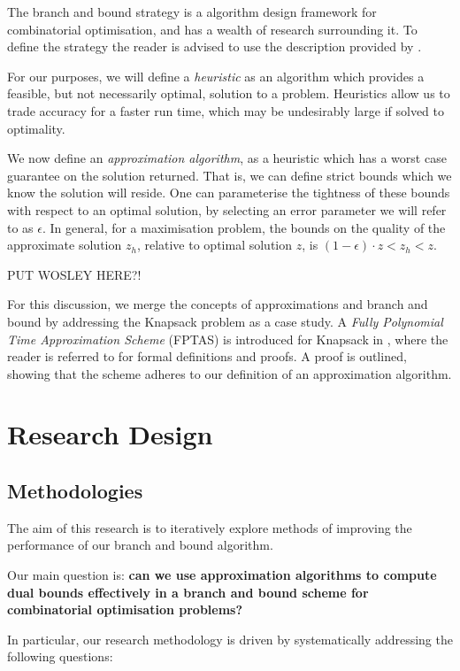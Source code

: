 \documentclass[12pt, a4paper]{article}
\begin{document}
The branch and bound strategy is a algorithm design framework for combinatorial optimisation, and has a wealth of research surrounding it. To define the strategy the reader is advised to use the description provided by \cite{BOOK:1}.

For our purposes, we will define a \textit{heuristic} as an algorithm which provides a feasible, but not necessarily optimal, solution to a problem. Heuristics allow us to trade accuracy for a faster run time, which may be undesirably large if solved to optimality.

We now define an \textit{approximation algorithm}, as a heuristic which has a worst case guarantee on the solution returned. That is, we can define strict bounds which we know the solution will reside. One can parameterise the tightness of these bounds with respect to an optimal solution, by selecting an error parameter we will refer to as $\epsilon$. In general, for a maximisation problem, the bounds on the quality of the approximate solution $z_h$, relative to optimal solution $z$, is $(1-\epsilon)\cdot z < z_h < z$.   

PUT WOSLEY HERE?!

For this discussion, we merge the concepts of approximations and branch and bound by addressing the Knapsack problem as a case study. A \textit{Fully Polynomial Time Approximation Scheme} (FPTAS) is introduced for Knapsack in \cite{BOOK:2}, where the reader is referred to for formal definitions and proofs. A proof is outlined, showing that the scheme adheres to our definition of an approximation algorithm.



\section{Research Design}

\subsection{Methodologies}

The aim of this research is to iteratively explore methods of improving the performance of our branch and bound algorithm. 

Our main question is: \textbf{can we use approximation algorithms to compute dual bounds effectively in a branch and bound scheme for combinatorial optimisation problems?}

In particular, our research methodology is driven by systematically addressing the following questions:
\end{document}
